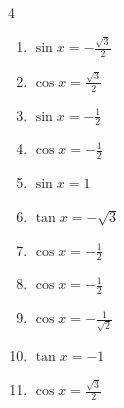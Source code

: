 \begin{multicols}{4}
\begin{enumerate}
  \item $\displaystyle \sin{x}  = -\frac{\sqrt{3}}{2}$


  \item $\displaystyle \cos{x}  = \frac{\sqrt{3}}{2}$


  \item $\displaystyle \sin{x}  = -\frac{1}{2}$


  \item $\displaystyle \cos{x}  = -\frac{1}{2}$


\columnbreak %

  \item $\displaystyle \sin{x}  = 1$


  \item $\displaystyle \tan{x}  = -\sqrt{3}$


  \item $\displaystyle \cos{x}  = -\frac{1}{2}$


  \item $\displaystyle \cos{x}  = -\frac{1}{2}$


  \item $\displaystyle \cos{x}  = -\frac{1}{\sqrt{2}}$


  \item $\displaystyle \tan{x}  = -1$


  \item $\displaystyle \cos{x}  = \frac{\sqrt{3}}{2}$



\end{enumerate}
\end{multicols}

